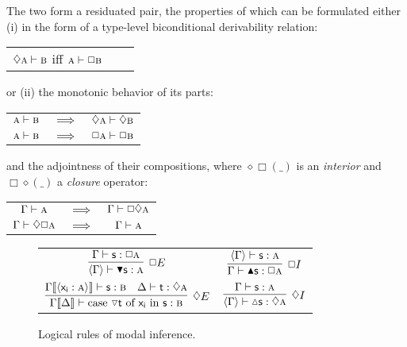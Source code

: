 The two form a residuated pair, the properties of which can be formulated either (i) in the form of a type-level biconditional derivability relation:
\begin{center}
	\begin{tabularx}{0.35\textwidth}{@{}ccc@{}}
	$\diamond \prop{A} \vdash \prop{B}$ iff $\prop{A} \vdash \Box\prop{B}$
	\end{tabularx}
\end{center}
or (ii) the monotonic behavior of its parts:
\begin{center}
	\begin{tabularx}{0.35\textwidth}{@{}ccc@{}}
		$\prop{A} \vdash \prop{B}$ & $\implies$ & $\diamond \prop{A}\vdash \diamond\prop{B}$\\
		$\prop{A} \vdash \prop{B}$ & $\implies$ & $ \Box{\prop{A}}\vdash \Box\prop{B}$\\
	\end{tabularx}
\end{center}
and the adjointness of their compositions, where $\diamond\Box(\_)$ is an \textit{interior} and $\Box\diamond(\_)$ a \textit{closure} operator:
\begin{center}
	\begin{tabularx}{0.35\textwidth}{@{}ccc@{}}
		$\Gamma \vdash \prop{A}$ & $\implies$ & $\Gamma \vdash \Box\diamond\prop{A}$\\
		$\Gamma \vdash \diamond\Box\prop{A}$ & $\implies$ & $ \Gamma \vdash \prop{A}$\\
	\end{tabularx}
\end{center}

\begin{figure}
	\centering
	\begin{tabularx}{0.9875\textwidth}{@{}CC@{}}
		$\infer[\Box E]{\bracket{\Gamma} \vdash \boxelim{\term{s}}: \prop{A}}{
			\Gamma \vdash \term{s}: \Box\prop{A}
		}$
		&
		$\infer[\Box I]{\Gamma \vdash \boxintro{\term{s}}:\Box\prop{A}}{
			\bracket{\Gamma} \vdash \term{s}:\prop{A}
		}$
		\\[\smallsep]
		$\infer[\diamond E]{\Gamma\ctx{\Delta} \vdash \cterm{case \term{\diaelim t} of \term{x_i} in \term{s}}: \prop{B}}{
			\Gamma\ctx{\bracket{\term{x_i}:\prop{A}}}\vdash\term{s}:\prop{B}
			&
			\Delta \vdash \term{t}:\diamond\prop{A}
		}
		$
		&
		$\infer[\diamond I]{\bracket{\Gamma} \vdash \diaintro{\term{s}}: \diamond \prop{A}}{
			\Gamma \vdash \term{s}:\prop{A}
		}$
	\end{tabularx}
	\caption{Logical rules of modal inference.}
	\label{figure:modal_logical}
\end{figure}

